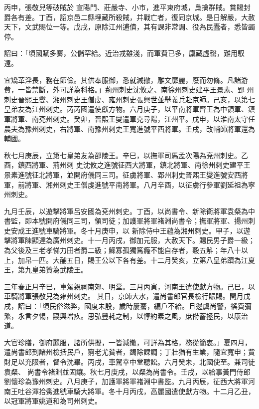 \begin{pinyinscope}
 丙申，張敬兒等破賊於
 宣陽門、莊嚴寺、小市，進平東府城，梟擒群賊。賞賜封爵各有差。丁酉，詔京邑二縣埋藏所殺賊，并戰亡者，復同京城。是日解嚴，大赦天下，文武賜位一等。戊戌，原除江州逋債，其有課非常調、役為民蠹者，悉皆蠲停。



 詔曰：「頃國賦多騫，公儲罕給。近治戎雖淺，而軍費已多，廩藏虛罄，難用馭遠。



 宜矯革淫長，務在節儉。其供奉服御，悉就減撤，雕文靡麗，廢而勿脩。凡諸游費，一皆禁斷，外可詳為科格。」荊州刺史沈攸之、南徐州刺史建平王景素、郢
 州刺史晉熙王燮、湘州刺史王僧虔、雍州刺史張興世並舉義兵赴京師。己亥，以第七皇弟友為江州刺史。芮芮國遣使獻方物。六月庚子，以平南將軍齊王為中領軍、鎮軍將軍、南兗州刺史。癸卯，晉熙王燮遣軍克尋陽，江州平。戊申，以淮南太守任農夫為豫州刺史，右將軍、南豫州刺史王寬進號平西將軍。壬戌，改輔師將軍還為輔國。



 秋七月庚辰，立第七皇弟友為邵陵王。辛巳，以撫軍司馬孟次陽為兗州刺史。乙酉，鎮西將軍、荊州刺
 史沈攸之進號征西大將軍，鎮北將軍、南徐州刺史建平王景素進號征北將軍，並開府儀同三司。征虜將軍、郢州刺史晉熙王燮進號安西將軍，前將軍、湘州刺史王僧虔進號平南將軍。八月辛酉，以征虜行參軍劉延祖為寧州刺史。



 九月壬辰，以遊擊將軍呂安國為兗州刺史。丁酉，以尚書令、新除衛將軍袁粲為中書監，即本號開府儀同三司，領司徒；加護軍將軍褚淵尚書令；撫軍將軍、揚州刺史安成王進號車騎將軍。冬十月庚申，以
 新除侍中王蘊為湘州刺史。甲子，以遊擊將軍陳顯達為廣州刺史。十一月丙戌，御加元服，大赦天下。賜民男子爵一級；為父後及三老孝悌力田者爵二級；鰥寡孤獨篤癃不能自存者，穀五斛；年八十以上，加帛一匹。大酺五日，賜王公以下各有差。十二月癸亥，立第八皇弟躋為江夏王，第九皇弟贊為武陵王。



 三年春正月辛巳，車駕親祠南郊、明堂。三月丙寅，河南王遣使獻方物。己巳，以車騎將軍張敬兒為雍州刺史。
 其日，京師大水，遣尚書郎官長檢行賑賜。閏月戊戌，詔曰：「頃民俗滋弊，國度未殷，歲時屢騫，編戶不給。且邊虞尚警，徭費彌繁，永言夕惕，寢興增疚。思弘豐耗之制，以惇約素之風，庶偫蓄拯民，以康治道。



 大官珍膳，御府麗服，諸所供擬，一皆減撤，可詳為其格，務從簡衷。」夏四月，遣尚書郎到諸州檢括民戶，窮老尤貧者，蠲除課調；丁壯猶有生業，隨宜寬申；貲財足以充限者，督令洗畢。丙戌，車駕幸中堂聽訟。六月癸未，北國使至。兼司徒袁粲、
 尚書令褚淵並固讓。秋七月庚戌，以粲為尚書令。壬戌，以給事黃門侍郎劉懷珍為豫州刺史。八月庚子，加護軍將軍褚淵中書監。九月丙辰，征西大將軍河南王吐谷渾拾夤進號車騎大將軍。冬十月丙戌，高麗國遣使獻方物。十二月乙丑，以冠軍將軍姚道和為司州刺史。




\end{pinyinscope}
